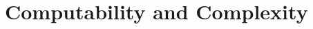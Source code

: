 \documentclass[11pt]{book}
\begin{document}
\part{Computability and Complexity}\label{part:p04}


\appendix
{}\label{annex:p04}


\printbibliography
\end{document}
